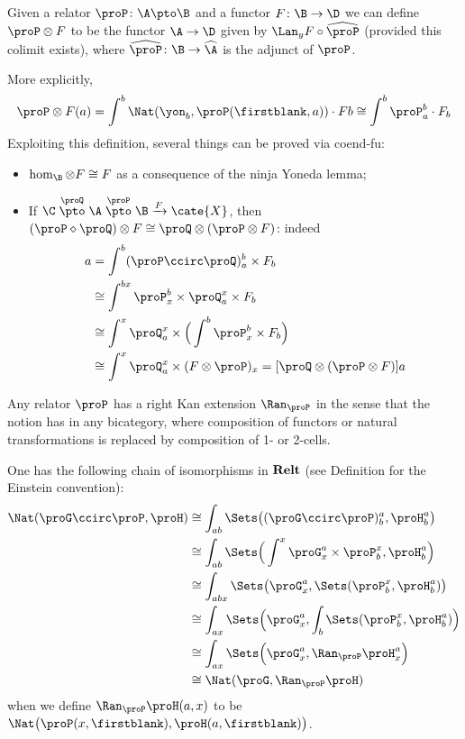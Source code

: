\begin{example}
Given a relator $\proP\colon \A\pto \B$ and a functor $F\colon \B\to \D$ we can define $\proP\otimes F$ to be the functor $\A\to \D$ given by $\Lan_{y}F\circ\widehat{\proP}$ (provided this colimit exists), where $\widehat\proP\colon \B\to\widehat{\A}$ is the adjunct of $\proP$. 

More explicitly, 
\[
\proP\otimes F(a) = \int^b \Nat(\yon_b,\proP(\firstblank,a))\cdot Fb\cong \int^b \proP^b_a\cdot F_b
\]
Exploiting this definition, several things can be proved via coend-fu:
\begin{itemize}
\item $\hom_{\B}\otimes F\cong F$ as a consequence of the ninja Yoneda lemma;
\item If $\C\stackrel{\proQ}{\pto}\A\stackrel{\proP}{\pto} \B\xrightarrow{F}\cate{X}$, then $(\proP\diamond \proQ)\otimes F\cong \proQ\otimes(\proP\otimes F)$: indeed
\begin{align*}
[(\proP\diamond \proQ)\otimes F]a & = \int^b (\proP\ccirc\proQ)^b_a\times F_b \\
&\cong \int^{bx}\proP^b_x\times \proQ^x_a\times F_b\\
&\cong \int^x\proQ^x_a \times\Big( \int^b\proP^b_x \times F_b \Big)\\
&\cong \int^x\proQ^x_a \times (F\otimes\proP)_x = [\proQ\otimes(\proP\otimes F)]a
\end{align*}
\end{itemize}
\end{example}
\begin{example}
Any relator $\proP$ has a right Kan extension $\Ran_\proP$ in the sense that the notion has in any bicategory, where composition of functors or natural transformations is replaced by composition of 1- or 2-cells.

One has the following chain of isomorphisms in $\textbf{Relt}$ (see Definition  for the Einstein convention):
\begin{align*}
\Nat(\proG\ccirc\proP,\proH) &\cong \int_{ab}\Sets\big( (\proG\ccirc \proP)^a_b,\proH^a_b \big)\\
&\cong \int_{ab} \Sets\Big( \int^x \proG^a_x \times \proP^x_b ,\proH^a_b\Big)\\
&\cong \int_{abx}\Sets\big( \proG^a_x,\Sets(\proP^x_b,\proH^a_b) \big)\\
&\cong \int_{ax}\Sets\Big( \proG^a_x,\int_b\Sets(\proP^x_b,\proH^a_b)\Big)\\
&\cong \int_{ax}\Sets\Big( \proG^a_x,\Ran_\proP\proH^a_x\Big)\\
&\cong \Nat(\proG,\Ran_\proP\proH)
\end{align*}
when we define $\Ran_\proP\proH(a,x)$ to be $\Nat\big(\proP(x,\firstblank),\proH(a,\firstblank)\big)$.
\end{example}
